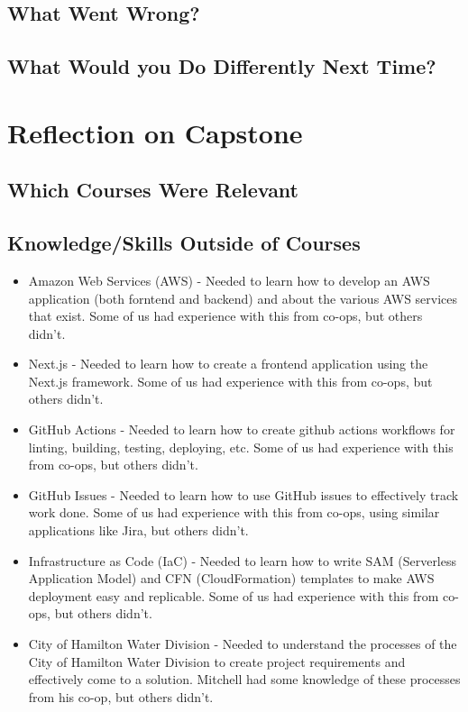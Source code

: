 \documentclass{article}
\begin{document}
\subsection{What Went Wrong?}


\subsection{What Would you Do Differently Next Time?}


\section{Reflection on Capstone}


\subsection{Which Courses Were Relevant}


\subsection{Knowledge/Skills Outside of Courses}
\begin{itemize}
  \item Amazon Web Services (AWS) - Needed to learn how to develop an AWS
    application (both forntend and backend) and about the various AWS
    services that exist. Some of us had experience with this from
    co-ops, but others didn't.
  \item Next.js - Needed to learn how to create a frontend application using
    the Next.js framework. Some of us had experience with this from
    co-ops, but others didn't.
  \item GitHub Actions - Needed to learn how to create github actions
    workflows for linting, building, testing, deploying, etc. Some of
    us had experience with this from co-ops, but others didn't.
  \item GitHub Issues - Needed to learn how to use GitHub issues to
    effectively track work done. Some of us had experience with this
    from co-ops, using similar applications like Jira, but others didn't.
  \item Infrastructure as Code (IaC) - Needed to learn how to write SAM
    (Serverless Application Model) and CFN (CloudFormation) templates to
    make AWS deployment easy and replicable. Some of us had
    experience with this from co-ops, but others didn't.
  \item City of Hamilton Water Division - Needed to understand the
    processes of the City of Hamilton Water Division to create
    project requirements and effectively come to a solution. Mitchell
    had some knowledge of these processes from his co-op, but others didn't.
\end{itemize}
\end{document}
